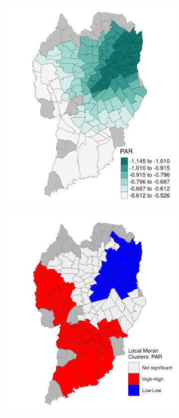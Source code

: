 \begin{figure}[!htbp]
    \centering\footnotesize
    \captionsetup{font=footnotesize}
    \caption{PAR COEFFICIENT ESTIMATES}
    \begin{subfigure}{0.5\textwidth}
        \includegraphics{fig/gwr_PAR.png}
    \end{subfigure}%
    \begin{subfigure}{0.5\textwidth}
        \includegraphics{fig/lisa_PAR.png}

\end{subfigure}
\end{figure}
